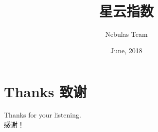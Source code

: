 \documentclass[10pt, mathserif]{beamer} %
\begin{document}
\title[abbreviation]{ 星云指数}
\author{ Nebulas Team}

\date{June, 2018}


\begin{frame}
    \titlepage	%
\end{frame}








\section{Thanks 致谢}
\begin{frame}
	Thanks for your listening. \\
	感谢！
\end{frame}
\end{document}
